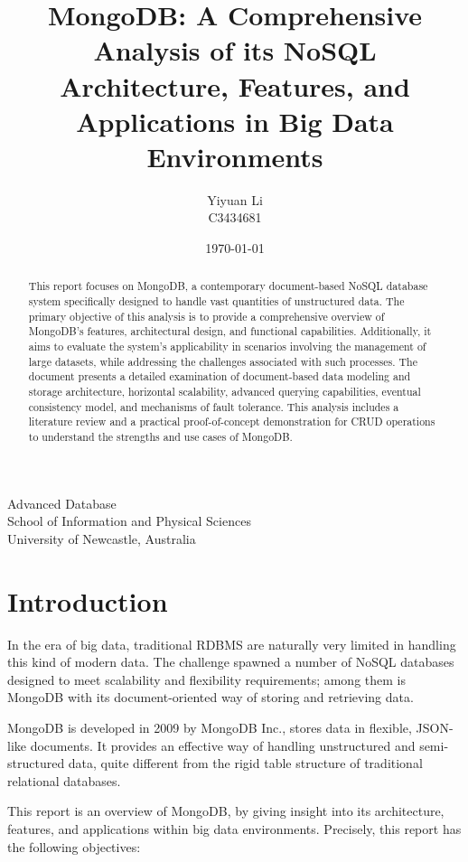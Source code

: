 \documentclass[12pt]{article}
\title{\textbf{\LARGE \textbf{MongoDB: A Comprehensive Analysis of its NoSQL Architecture, Features, and Applications in Big Data Environments}}}
\author{Yiyuan Li \\ C3434681}
\date{\today}
\begin{document}
\maketitle

\begin{center}
  Advanced Database \\
  School of Information and Physical Sciences \\
  University of Newcastle, Australia \\
\end{center}

\begin{abstract}
This report focuses on MongoDB, a contemporary document-based NoSQL
database system specifically designed to handle vast quantities of
unstructured data. The primary objective of this analysis is to provide
a comprehensive overview of MongoDB's features, architectural design,
and functional capabilities. Additionally, it aims to evaluate the
system's applicability in scenarios involving the management of large
datasets, while addressing the challenges associated with such
processes. The document presents a detailed examination of
document-based data modeling and storage architecture, horizontal
scalability, advanced querying capabilities, eventual consistency model,
and mechanisms of fault tolerance. This analysis includes a literature
review and a practical proof-of-concept demonstration for CRUD
operations to understand the strengths and use cases of MongoDB.
\end{abstract}

\newpage

\section{Introduction}\label{introduction}

In the era of big data, traditional RDBMS are naturally very limited in
handling this kind of modern data. The challenge spawned a number of
NoSQL databases designed to meet scalability and flexibility
requirements; among them is MongoDB with its document-oriented way of
storing and retrieving data.

MongoDB is developed in 2009 by MongoDB Inc., stores data in flexible,
JSON-like documents. It provides an effective way of handling
unstructured and semi-structured data, quite different from the rigid
table structure of traditional relational databases.

This report is an overview of MongoDB, by giving insight into its
architecture, features, and applications within big data environments.
Precisely, this report has the following objectives:
\end{document}
